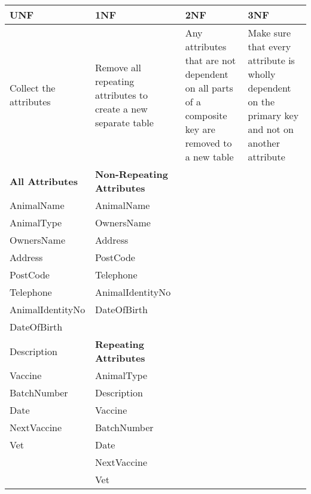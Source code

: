 \documentclass{article}
\begin{document}
\begin{center}
\begin{tabular}{|p{3cm}|p{5cm}|p{3cm}|p{3cm}|} \hline
\textbf{UNF} & \textbf{1NF} & \textbf{2NF} & \textbf{3NF} \\ \hline
Collect the attributes & Remove all repeating attributes to create a new separate table & Any attributes that are not dependent on all parts of a composite key are removed to a new table & Make sure that every attribute is wholly dependent on the primary key and not on another attribute \\ \hline
\textbf{All Attributes} & \textbf{Non-Repeating Attributes} &  &  \\ 
AnimalName & AnimalName & & \\
AnimalType & OwnersName & & \\
OwnersName & Address & & \\
Address & PostCode & & \\
PostCode & Telephone & & \\
Telephone & AnimalIdentityNo & & \\
AnimalIdentityNo & DateOfBirth & & \\
DateOfBirth &  & & \\
Description & \textbf{Repeating Attributes} & & \\
Vaccine & AnimalType & & \\
BatchNumber & Description & & \\
Date & Vaccine & & \\
NextVaccine & BatchNumber & & \\ 
Vet & Date & & \\
& NextVaccine & & \\
& Vet & & \\ \hline
\end{tabular}
\end{center}

\end{document}

